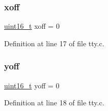 \subsubsection{\texorpdfstring{xoff}{xoff}}
{\footnotesize\ttfamily \hyperlink{a00092_a273cf69d639a59973b6019625df33e30_a273cf69d639a59973b6019625df33e30}{uint16\+\_\+t} xoff = 0}



Definition at line 17 of file tty.\+c.

\mbox{\label{a00107_a1a7539764d0ae8cd06ce45c62cf92bca_a1a7539764d0ae8cd06ce45c62cf92bca}} 
\subsubsection{\texorpdfstring{yoff}{yoff}}
{\footnotesize\ttfamily \hyperlink{a00092_a273cf69d639a59973b6019625df33e30_a273cf69d639a59973b6019625df33e30}{uint16\+\_\+t} yoff = 0}



Definition at line 18 of file tty.\+c.

